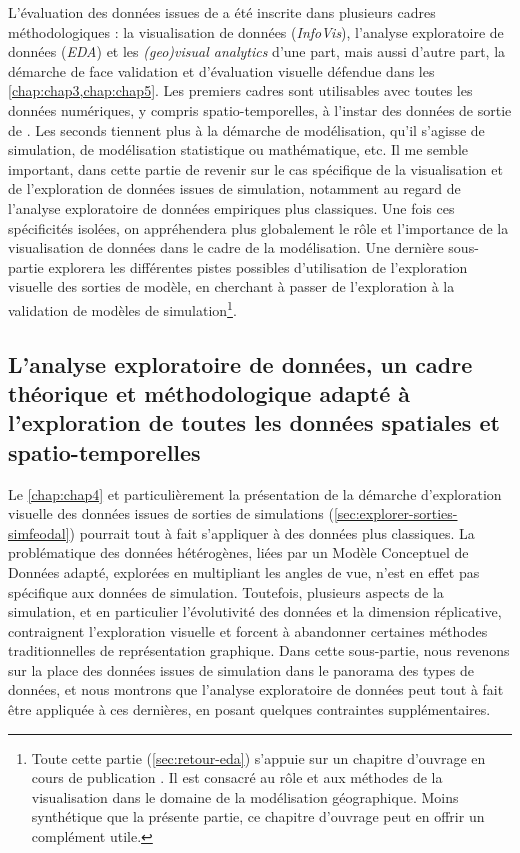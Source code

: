 L'évaluation des données issues de \simfeodal{} a été inscrite dans plusieurs cadres méthodologiques :
	la visualisation de données (\textit{InfoVis}), l'analyse exploratoire de données (\textit{EDA}) et les \textit{(geo)visual analytics} d'une part, mais aussi d'autre part, la démarche de face validation et d'évaluation visuelle défendue dans les \cref{chap:chap3,chap:chap5}.
Les premiers cadres sont utilisables avec toutes les données numériques, y compris spatio-temporelles, à l'instar des données de sortie de \simfeodal{}.
Les seconds tiennent plus à la démarche de modélisation, qu'il s'agisse de simulation, de modélisation statistique ou mathématique, etc.
Il me semble important, dans cette partie de revenir sur le cas spécifique de la visualisation et de l'exploration de données issues de simulation, notamment au regard de l'analyse exploratoire de données empiriques plus classiques.
Une fois ces spécificités isolées, on appréhendera plus globalement le rôle et l'importance de la visualisation de données dans le cadre de la modélisation.
Une dernière sous-partie explorera les différentes pistes possibles d'utilisation de l'exploration visuelle des sorties de modèle, en cherchant à passer de l'exploration à la validation de modèles de simulation\footnote{
	Toute cette partie (\cref{sec:retour-eda}) s'appuie sur un chapitre d'ouvrage en cours de publication \autocite{cura_visualisation_2020}.
	Il est consacré au rôle et aux méthodes de la visualisation dans le domaine de la modélisation géographique.
	Moins synthétique que la présente partie, ce chapitre d'ouvrage peut en offrir un complément utile.
}.



\subsection{L'analyse exploratoire de données, un cadre théorique et méthodologique adapté à l'exploration de toutes les données spatiales et spatio-temporelles \label{subsec:genericite-donnees-simul}}

Le \cref{chap:chap4} et particulièrement la présentation de la démarche d'exploration visuelle des données issues de sorties de simulations (\cref{sec:explorer-sorties-simfeodal}) pourrait tout à fait s'appliquer à des données plus classiques.
La problématique des données hétérogènes, liées par un Modèle Conceptuel de Données adapté, explorées en multipliant les angles de vue, n'est en effet pas spécifique aux données de simulation.
Toutefois, plusieurs aspects de la simulation, et en particulier l'évolutivité des données et la dimension réplicative, contraignent l'exploration visuelle et forcent à abandonner certaines méthodes traditionnelles de représentation graphique.
Dans cette sous-partie, nous revenons sur la place des données issues de simulation dans le panorama des types de données, et nous montrons que l'analyse exploratoire de données peut tout à fait être appliquée à ces dernières, en posant quelques contraintes supplémentaires.

